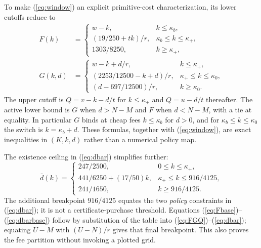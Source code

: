 To make (\ref{eq:window}) an explicit primitive-cost characterization, its lower cutoffs reduce to
\begin{align}
 F(k)&=\begin{cases}w-k,&k\leq\kappa_b,\\
 (19/250+tk)/r,&\kappa_b\leq k\leq\kappa_+,\\
 1303/8250,&k\geq\kappa_+,
 \end{cases}\label{eq:Fbase}\\
 G(k,d)&=\begin{cases}w-k+d/r,&k\leq\kappa_+,\\
 (2253/12500-k+d)/r,&\kappa_+\leq k\leq\kappa_0,\\
 (d-697/12500)/r,&k\geq\kappa_0.
 \end{cases}\label{eq:Gbase}
\end{align}
The upper cutoff is $Q=v-k-d/t$ for $k\leq\kappa_+$ and $Q=u-d/t$ thereafter. The active lower bound is $G$ when $d>N-M$ and $F$ when $d<N-M$, with a tie at equality. In particular $G$ binds at cheap fees $k\leq\kappa_b$ for $d>0$, and for $\kappa_b\leq k\leq\kappa_0$ the switch is $k=\kappa_b+d$. These formulas, together with (\ref{eq:window}), are exact inequalities in $(K,k,d)$ rather than a numerical policy map.

The existence ceiling in (\ref{eq:dbar}) simplifies further:
\begin{equation}
 \bar d(k)=\begin{cases}
 247/2500,&0\leq k\leq\kappa_+,\\
 441/6250+(17/50)k,&\kappa_+\leq k\leq916/4125,\\
 241/1650,&k\geq916/4125.
 \end{cases}\label{eq:dbarbase}
\end{equation}
The additional breakpoint $916/4125$ equates the two \emph{policy} constraints in (\ref{eq:dbar}); it is not a certificate-purchase threshold. Equations (\ref{eq:Fbase})--(\ref{eq:dbarbase}) follow by substitution of the table into (\ref{eq:FGQ})--(\ref{eq:dbar}); equating $U-M$ with $(U-N)/r$ gives that final breakpoint. This also proves the fee partition without invoking a plotted grid.

